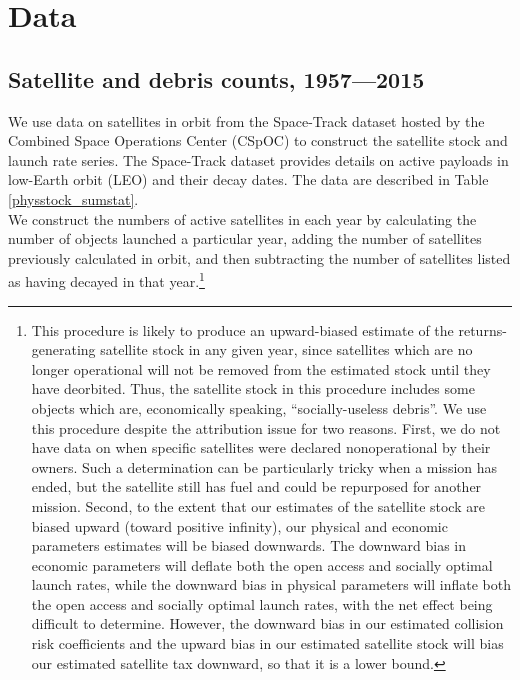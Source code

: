 \documentclass[12pt]{article}
\begin{document}
\section{Data}

\subsection{Satellite and debris counts, 1957---2015}

We use data on satellites in orbit from the Space-Track dataset hosted by the Combined Space Operations Center (CSpOC) \citep{spacetrackData} to construct the satellite stock and launch rate series. The Space-Track dataset provides details on active payloads in low-Earth orbit (LEO) and their decay dates. The data are described in Table \ref{physstock_sumstat}.\\

We construct the numbers of active satellites in each year by calculating the number of objects launched a particular year, adding the number of satellites previously calculated in orbit, and then subtracting the number of satellites listed as having decayed in that year.\footnote{This procedure is likely to produce an upward-biased estimate of the returns-generating satellite stock in any given year, since satellites which are no longer operational will not be removed from the estimated stock until they have deorbited. Thus, the satellite stock in this procedure includes some objects which are, economically speaking, ``socially-useless debris''. We use this procedure despite the attribution issue for two reasons. First, we do not have data on when specific satellites were declared nonoperational by their owners. Such a determination can be particularly tricky when a mission has ended, but the satellite still has fuel and could be repurposed for another mission. Second, to the extent that our estimates of the satellite stock are biased upward (toward positive infinity), our physical and economic parameters estimates will be biased downwards. The downward bias in economic parameters will deflate both the open access and socially optimal launch rates, while the downward bias in physical parameters will inflate both the open access and socially optimal launch rates, with the net effect being difficult to determine. However, the downward bias in our estimated collision risk coefficients and the upward bias in our estimated satellite stock will bias our estimated satellite tax downward, so that it is a lower bound.} \\
\end{document}
